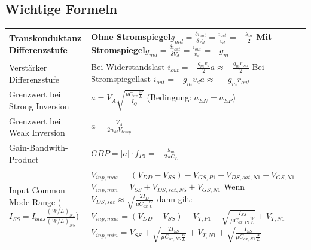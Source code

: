 \subsection{Wichtige Formeln}
\renewcommand{\arraystretch}{2}
\begin{tabular}{|l|l|}
\hline
Transkonduktanz Differenzstufe & \makecell[l]{Ohne Stromspiegel\hspace{10pt}$g_{md} = \frac{\delta i_{out}}{\delta V_d} = \frac{i_{out}}{v_d}=-\frac{g_m}{2}$\\Mit Stromspiegel\hspace{10pt}$g_{md} = \frac{\delta i_{out}}{\delta V_d} = \frac{i_{out}}{v_d}=-g_m$}\\
\hline
Verstärker Differenzstufe & \makecell[l]{Bei Widerstandslast\hspace{10pt} $i_{out}=-\frac{g_m v_d}{2}$\hspace{20pt}$a\approx - \frac{g_m r_{out}}{2}$\\Bei Stromspiegellast\hspace{10pt} $i_{out}=-g_m v_d$\hspace{20pt}$a\approx\ -g_m r_{out}$}\\
\hline
Grenzwert bei Strong Inversion & $a = V_A\sqrt{\frac{\mu C_{ox}\frac{W}{L}}{I_Q}}$ (Bedingung: $a_{EN} = a_{EP}$)\\
\hline
Grenzwert bei Weak Inversion & $a = \frac{V_A}{2 n_M V_{temp}}$\\
\hline
Gain-Bandwith-Product & $GBP = |a|\cdot f_{P1} = -\frac{g_m}{2\pi C_L}$\\
\hline
\makecell[l]{Input Common Mode Range\\($I_{SS}= I_{bias}\frac{(W/L)_{N1}}{(W/L)_{N5}}$)}& \makecell[l]{$V_{inp,max} = (V_{DD}-V_{SS})-V_{GS,P1}-V_{DS,sat,N1}+V_{GS,N1}$\\$V_{inp,min} = V_{SS}+V_{DS,sat,N5}+V_{GS,N1}$ \vspace{5pt}\\Wenn $V_{DS,sat}\approx\sqrt{\frac{2I_D}{\mu C_{ox}\frac{W}{L}}}$ dann gilt:\\$V_{inp,max} = (V_{DD}-V_{SS})-V_{T,P1}-\sqrt{\frac{I_{SS}}{\mu C_{ox,P1}\frac{W}{L}}}+V_{T,N1}$\\$V_{inp,min} = V_{SS}+\sqrt{\frac{2I_{SS}}{\mu C_{ox,N5}\frac{W}{L}}}+V_{T,N1}+\sqrt{\frac{I_{SS}}{\mu C_{ox,N1}\frac{W}{L}}}$}\\
\hline

\end{tabular}
